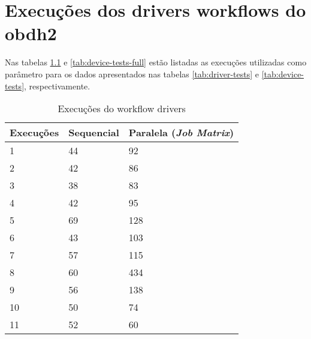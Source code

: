 \chapter{Execuções dos drivers workflows do obdh2}
\label{apendice:tabelas}

Nas tabelas \ref{tab:driver-tests-full} e \ref{tab:device-tests-full} estão listadas as execuções utilizadas como parâmetro para os dados apresentados nas tabelas \ref{tab:driver-tests} e \ref{tab:device-tests}, respectivamente.


\begin{table}[ht!]
\centering
\begin{tabular}{|l|l|l|}
\hline
\textbf{Execuções} & \textbf{Sequencial} & \textbf{Paralela} (\textit{Job Matrix}) \\ \hline
1         & 44         & 92                    \\ \hline
2         & 42         & 86                    \\ \hline
3         & 38         & 83                    \\ \hline
4         & 42         & 95                    \\ \hline
5         & 69         & 128                   \\ \hline
6         & 43         & 103                   \\ \hline
7         & 57         & 115                   \\ \hline
8         & 60         & 434                   \\ \hline
9         & 56         & 138                   \\ \hline
10        & 50         & 74                    \\ \hline
11        & 52         & 60                    \\ \hline
\end{tabular}
\caption{Execuções do workflow drivers}
\label{tab:driver-tests-full}
\end{table}

